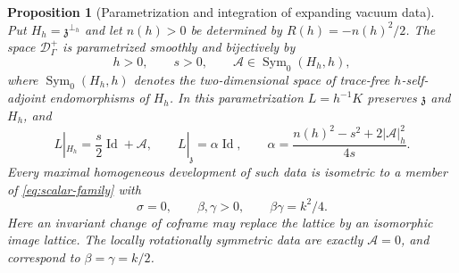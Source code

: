 \documentclass[10pt,a4paper]{article}
\numberwithin{equation}{section}
\newtheorem{proposition}[theorem]{Proposition}
\theoremstyle{definition}
\theoremstyle{remark}
\begin{document}
\begin{proposition}[Parametrization and integration of expanding vacuum data]
\label{prop:all-expanding-vacuum-data}
Put $H_h=\mathfrak z^{\perp_h}$ and let $n(h)>0$ be determined by
$R(h)=-n(h)^2/2$.  The space $\mathscr D^+_\Gamma$ is parametrized
smoothly and bijectively by
\begin{equation}
 h>0,\qquad s>0,\qquad
 \mathcal A\in\operatorname{Sym}_0(H_h,h),
 \label{eq:all-vacuum-data-parameters}
\end{equation}
where $\operatorname{Sym}_0(H_h,h)$ denotes the two-dimensional space
of trace-free $h$-self-adjoint endomorphisms of $H_h$.  In this
parametrization $L=h^{-1}K$ preserves $\mathfrak z$ and $H_h$, and
\begin{equation}
 L|_{H_h}=\frac{s}{2}\operatorname{Id}+\mathcal A,
 \qquad
 L|_{\mathfrak z}=\alpha\operatorname{Id},\qquad
 \alpha=\frac{n(h)^2-s^2+2|\mathcal A|_h^2}{4s}.
 \label{eq:all-vacuum-data-formula}
\end{equation}
Every maximal homogeneous development of such data is isometric to
a member of \eqref{eq:scalar-family} with
\begin{equation}
 \sigma=0,\qquad \beta,\gamma>0,\qquad
 \beta\gamma=k^2/4.
 \label{eq:all-vacuum-positive-branch}
\end{equation}
Here an invariant change of coframe may replace the lattice by an
isomorphic image lattice.  The locally rotationally symmetric data
are exactly $\mathcal A=0$, and correspond to $\beta=\gamma=k/2$.
\end{proposition}
\end{document}

